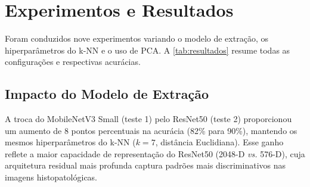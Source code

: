 \documentclass[10pt,twocolumn,letterpaper]{article}
\begin{document}
\section{Experimentos e Resultados}
\label{sec:resultados}

Foram conduzidos nove experimentos variando o modelo de extração, os hiperparâmetros do k-NN e o uso de PCA. A \cref{tab:resultados} resume todas as configurações e respectivas acurácias.

\begin{table}[t]
\centering
\caption{Resumo dos experimentos realizados. A coluna \textit{Dim.} indica a dimensionalidade final das características utilizadas pelo k-NN.}
\label{tab:resultados}
\end{table}

\subsection{Impacto do Modelo de Extração}

A troca do MobileNetV3 Small (teste 1) pelo ResNet50 (teste 2) proporcionou um aumento de 8 pontos percentuais na acurácia (82\% para 90\%), mantendo os mesmos hiperparâmetros do k-NN ($k=7$, distância Euclidiana). Esse ganho reflete a maior capacidade de representação do ResNet50 (2048-D \textit{vs.} 576-D), cuja arquitetura residual mais profunda captura padrões mais discriminativos nas imagens histopatológicas.
\end{document}
